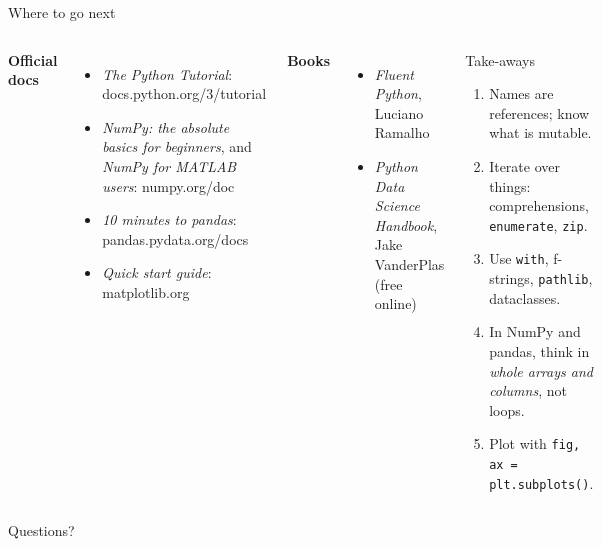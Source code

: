 \documentclass[aspectratio=169,9pt]{beamer}
\newcommand{\head}[1]{{\color{pyblue!80!black}\bfseries #1}\par\vspace{1pt}}
\begin{document}
\begin{frame}{Where to go next}
\begin{columns}[T]
\head{Official docs}
\begin{itemize}\setlength\itemsep{3pt}
  \item \emph{The Python Tutorial}: docs.python.org/3/tutorial
  \item \emph{NumPy: the absolute basics for beginners}, and
        \emph{NumPy for MATLAB users}: numpy.org/doc
  \item \emph{10 minutes to pandas}: pandas.pydata.org/docs
  \item \emph{Quick start guide}: matplotlib.org
\end{itemize}
\medskip
\head{Books}
\begin{itemize}\setlength\itemsep{3pt}
  \item \emph{Fluent Python}, Luciano Ramalho
  \item \emph{Python Data Science Handbook}, Jake VanderPlas
        (free online)
\end{itemize}
\begin{exampleblock}{Take-aways}
\begin{enumerate}\setlength\itemsep{3pt}
  \item Names are references; know what is mutable.
  \item Iterate over things: comprehensions, \texttt{enumerate},
        \texttt{zip}.
  \item Use \texttt{with}, f-strings, \texttt{pathlib}, dataclasses.
  \item In NumPy and pandas, think in \emph{whole arrays and
        columns}, not loops.
  \item Plot with \texttt{fig, ax = plt.subplots()}.
\end{enumerate}
\end{exampleblock}
\end{columns}
\end{frame}

\begin{frame}[standout]
Questions?
\end{frame}
\end{document}
